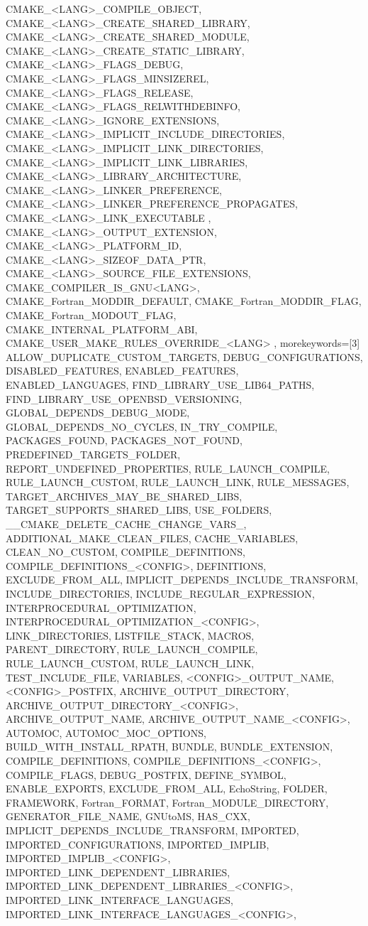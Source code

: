 {{CMAKE_<LANG>_COMPILE_OBJECT,
CMAKE_<LANG>_CREATE_SHARED_LIBRARY,
CMAKE_<LANG>_CREATE_SHARED_MODULE,
CMAKE_<LANG>_CREATE_STATIC_LIBRARY,
CMAKE_<LANG>_FLAGS_DEBUG,
CMAKE_<LANG>_FLAGS_MINSIZEREL,
CMAKE_<LANG>_FLAGS_RELEASE,
CMAKE_<LANG>_FLAGS_RELWITHDEBINFO,
CMAKE_<LANG>_IGNORE_EXTENSIONS,
CMAKE_<LANG>_IMPLICIT_INCLUDE_DIRECTORIES,
CMAKE_<LANG>_IMPLICIT_LINK_DIRECTORIES,
CMAKE_<LANG>_IMPLICIT_LINK_LIBRARIES,
CMAKE_<LANG>_LIBRARY_ARCHITECTURE,
CMAKE_<LANG>_LINKER_PREFERENCE,
CMAKE_<LANG>_LINKER_PREFERENCE_PROPAGATES,
CMAKE_<LANG>_LINK_EXECUTABLE ,
CMAKE_<LANG>_OUTPUT_EXTENSION,
CMAKE_<LANG>_PLATFORM_ID,
CMAKE_<LANG>_SIZEOF_DATA_PTR,
CMAKE_<LANG>_SOURCE_FILE_EXTENSIONS,
CMAKE_COMPILER_IS_GNU<LANG>,
CMAKE_Fortran_MODDIR_DEFAULT,
CMAKE_Fortran_MODDIR_FLAG,
CMAKE_Fortran_MODOUT_FLAG,
CMAKE_INTERNAL_PLATFORM_ABI,
CMAKE_USER_MAKE_RULES_OVERRIDE_<LANG>
         },
         morekeywords=[3]{
ALLOW_DUPLICATE_CUSTOM_TARGETS,
DEBUG_CONFIGURATIONS,
DISABLED_FEATURES,
ENABLED_FEATURES,
ENABLED_LANGUAGES,
FIND_LIBRARY_USE_LIB64_PATHS,
FIND_LIBRARY_USE_OPENBSD_VERSIONING,
GLOBAL_DEPENDS_DEBUG_MODE,
GLOBAL_DEPENDS_NO_CYCLES,
IN_TRY_COMPILE,
PACKAGES_FOUND,
PACKAGES_NOT_FOUND,
PREDEFINED_TARGETS_FOLDER,
REPORT_UNDEFINED_PROPERTIES,
RULE_LAUNCH_COMPILE,
RULE_LAUNCH_CUSTOM,
RULE_LAUNCH_LINK,
RULE_MESSAGES,
TARGET_ARCHIVES_MAY_BE_SHARED_LIBS,
TARGET_SUPPORTS_SHARED_LIBS,
USE_FOLDERS,
__CMAKE_DELETE_CACHE_CHANGE_VARS_,
ADDITIONAL_MAKE_CLEAN_FILES,
CACHE_VARIABLES,
CLEAN_NO_CUSTOM,
COMPILE_DEFINITIONS,
COMPILE_DEFINITIONS_<CONFIG>,
DEFINITIONS,
EXCLUDE_FROM_ALL,
IMPLICIT_DEPENDS_INCLUDE_TRANSFORM,
INCLUDE_DIRECTORIES,
INCLUDE_REGULAR_EXPRESSION,
INTERPROCEDURAL_OPTIMIZATION,
INTERPROCEDURAL_OPTIMIZATION_<CONFIG>,
LINK_DIRECTORIES,
LISTFILE_STACK,
MACROS,
PARENT_DIRECTORY,
RULE_LAUNCH_COMPILE,
RULE_LAUNCH_CUSTOM,
RULE_LAUNCH_LINK,
TEST_INCLUDE_FILE,
VARIABLES,
<CONFIG>_OUTPUT_NAME,
<CONFIG>_POSTFIX,
ARCHIVE_OUTPUT_DIRECTORY,
ARCHIVE_OUTPUT_DIRECTORY_<CONFIG>,
ARCHIVE_OUTPUT_NAME,
ARCHIVE_OUTPUT_NAME_<CONFIG>,
AUTOMOC,
AUTOMOC_MOC_OPTIONS,
BUILD_WITH_INSTALL_RPATH,
BUNDLE,
BUNDLE_EXTENSION,
COMPILE_DEFINITIONS,
COMPILE_DEFINITIONS_<CONFIG>,
COMPILE_FLAGS,
DEBUG_POSTFIX,
DEFINE_SYMBOL,
ENABLE_EXPORTS,
EXCLUDE_FROM_ALL,
EchoString,
FOLDER,
FRAMEWORK,
Fortran_FORMAT,
Fortran_MODULE_DIRECTORY,
GENERATOR_FILE_NAME,
GNUtoMS,
HAS_CXX,
IMPLICIT_DEPENDS_INCLUDE_TRANSFORM,
IMPORTED,
IMPORTED_CONFIGURATIONS,
IMPORTED_IMPLIB,
IMPORTED_IMPLIB_<CONFIG>,
IMPORTED_LINK_DEPENDENT_LIBRARIES,
IMPORTED_LINK_DEPENDENT_LIBRARIES_<CONFIG>,
IMPORTED_LINK_INTERFACE_LANGUAGES,
IMPORTED_LINK_INTERFACE_LANGUAGES_<CONFIG>,
}}
